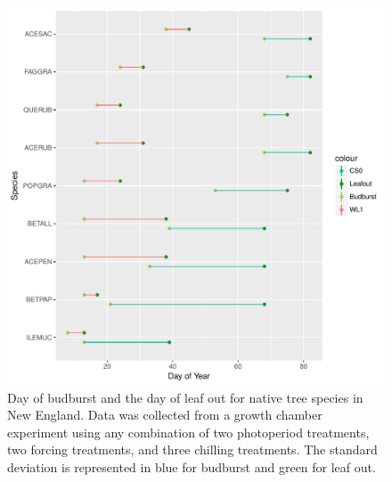 \documentclass{article}\usepackage[]{graphicx}\usepackage[]{color}
\makeatletter
\def\maxwidth{ %
  \ifdim\Gin@nat@width>\linewidth
    \linewidth
  \else
    \Gin@nat@width
  \fi
}
\makeatother
\begin{document}
\begin{figure}[H]
\includegraphics[width=\maxwidth]{figure/dan-1} \caption[Day of budburst and the day of leaf out for native tree species in New England]{Day of budburst and the day of leaf out for native tree species in New England. Data was collected from a growth chamber experiment using any combination of two photoperiod treatments, two forcing treatments, and three chilling treatments. The standard deviation is represented in blue for budburst and green for leaf out.}\label{fig:dan}
\end{figure}
\end{document}
